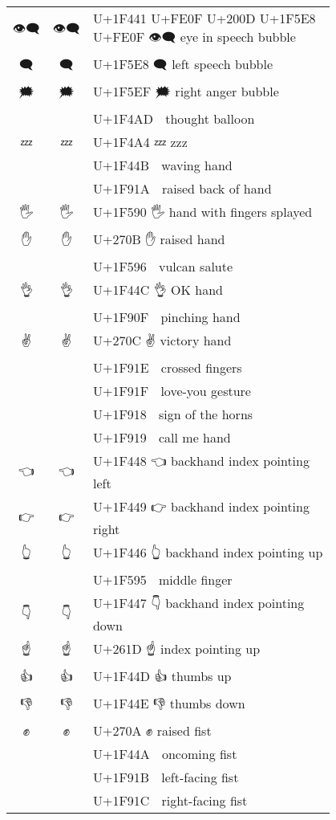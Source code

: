 \documentclass[a4paper,12pt]{article}
\newcommand{\fontA}[1]{{\fontspec[RawFeature={dist,ccmp}]{Segoe UI Emoji} #1}}
\newcommand{\fontB}[1]{{\fontspec[Ligatures=Common,RawFeature={+ccmp}]{Symbola_Hinted.ttf} #1}}
\begin{document}
\begin{longtable}[c]{ccp{0.8\linewidth}}
\fontA{👁️‍🗨️}&\fontB{👁️‍🗨️}&U+1F441 U+FE0F U+200D U+1F5E8 U+FE0F 👁️‍🗨️ eye in speech bubble\\
\fontA{🗨}&\fontB{🗨}&U+1F5E8 🗨 left speech bubble\\
\fontA{🗯}&\fontB{🗯}&U+1F5EF 🗯 right anger bubble\\
\fontA{💭}&\fontB{💭}&U+1F4AD 💭 thought balloon\\
\fontA{💤}&\fontB{💤}&U+1F4A4 💤 zzz\\
\fontA{👋}&\fontB{👋}&U+1F44B 👋 waving hand\\
\fontA{🤚}&\fontB{🤚}&U+1F91A 🤚 raised back of hand\\
\fontA{🖐}&\fontB{🖐}&U+1F590 🖐 hand with fingers splayed\\
\fontA{✋}&\fontB{✋}&U+270B ✋ raised hand\\
\fontA{🖖}&\fontB{🖖}&U+1F596 🖖 vulcan salute\\
\fontA{👌}&\fontB{👌}&U+1F44C 👌 OK hand\\
\fontA{🤏}&\fontB{🤏}&U+1F90F 🤏 pinching hand\\
\fontA{✌}&\fontB{✌}&U+270C ✌ victory hand\\
\fontA{🤞}&\fontB{🤞}&U+1F91E 🤞 crossed fingers\\
\fontA{🤟}&\fontB{🤟}&U+1F91F 🤟 love-you gesture\\
\fontA{🤘}&\fontB{🤘}&U+1F918 🤘 sign of the horns\\
\fontA{🤙}&\fontB{🤙}&U+1F919 🤙 call me hand\\
\fontA{👈}&\fontB{👈}&U+1F448 👈 backhand index pointing left\\
\fontA{👉}&\fontB{👉}&U+1F449 👉 backhand index pointing right\\
\fontA{👆}&\fontB{👆}&U+1F446 👆 backhand index pointing up\\
\fontA{🖕}&\fontB{🖕}&U+1F595 🖕 middle finger\\
\fontA{👇}&\fontB{👇}&U+1F447 👇 backhand index pointing down\\
\fontA{☝}&\fontB{☝}&U+261D ☝ index pointing up\\
\fontA{👍}&\fontB{👍}&U+1F44D 👍 thumbs up\\
\fontA{👎}&\fontB{👎}&U+1F44E 👎 thumbs down\\
\fontA{✊}&\fontB{✊}&U+270A ✊ raised fist\\
\fontA{👊}&\fontB{👊}&U+1F44A 👊 oncoming fist\\
\fontA{🤛}&\fontB{🤛}&U+1F91B 🤛 left-facing fist\\
\fontA{🤜}&\fontB{🤜}&U+1F91C 🤜 right-facing fist\\

\end{longtable}
\end{document}
